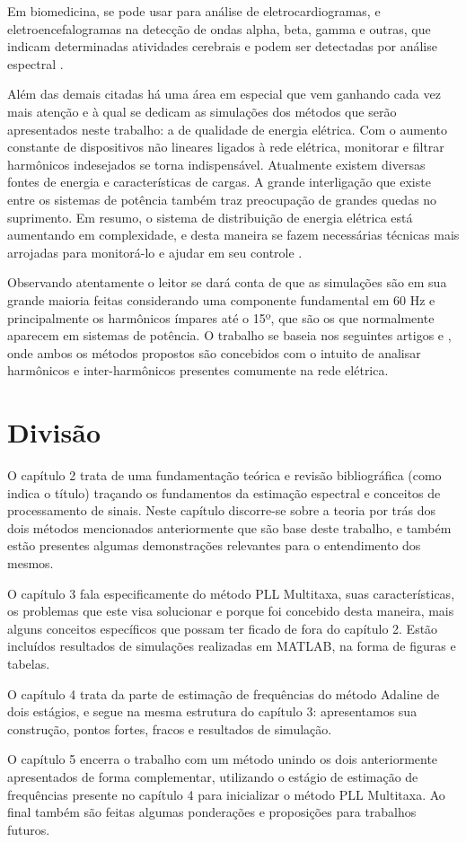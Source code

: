Em biomedicina, se pode usar para análise de eletrocardiogramas, e eletroencefalogramas na detecção de ondas alpha, beta, gamma e outras, que indicam determinadas atividades cerebrais e podem ser detectadas por análise espectral \cite{sornmo2005bioelectrical}.  

Além das demais citadas há uma área em especial que vem ganhando cada vez mais atenção e à qual se dedicam as simulações dos métodos que serão apresentados neste trabalho: a de qualidade de energia elétrica. Com o aumento constante de dispositivos não lineares ligados à rede elétrica, monitorar e filtrar harmônicos indesejados se torna indispensável. Atualmente existem diversas fontes de energia e características de cargas. A grande interligação que existe entre os sistemas de potência também traz preocupação de grandes quedas no suprimento. Em resumo, o sistema de distribuição de energia elétrica está aumentando em complexidade, e desta maneira se fazem necessárias técnicas mais arrojadas para monitorá-lo e ajudar em seu controle \cite{dugan1996electrical}.

Observando atentamente o leitor se dará conta de que as simulações são em sua grande maioria feitas considerando uma componente fundamental em 60 Hz e principalmente os harmônicos ímpares até o 15º, que são os que normalmente aparecem em sistemas de potência. O trabalho se baseia nos seguintes artigos \cite{de2009pll} e \cite{chang2009two}, onde ambos os métodos propostos são concebidos com o intuito de analisar harmônicos e inter-harmônicos presentes comumente na rede elétrica.

\section{Divisão}

O capítulo 2 trata de uma fundamentação teórica e revisão bibliográfica (como indica o título) traçando os fundamentos da estimação espectral e conceitos de processamento de sinais. Neste capítulo discorre-se sobre a teoria por trás dos dois métodos mencionados anteriormente que são base deste trabalho, e também estão presentes algumas demonstrações relevantes para o entendimento dos mesmos. 

O capítulo 3 fala especificamente do método PLL Multitaxa, suas características, os problemas que este visa solucionar e porque foi concebido desta maneira, mais alguns conceitos específicos que possam ter ficado de fora do capítulo 2. Estão incluídos resultados de simulações realizadas em MATLAB, na forma de figuras e tabelas.

O capítulo 4 trata da parte de estimação de frequências do método Adaline de dois estágios, e segue na mesma estrutura do capítulo 3: apresentamos sua construção, pontos fortes, fracos e resultados de simulação.

O capítulo 5 encerra o trabalho com um método unindo os dois anteriormente apresentados de forma complementar, utilizando o estágio de estimação de frequências presente no capítulo 4 para inicializar o método PLL Multitaxa. Ao final também são feitas algumas ponderações e proposições para trabalhos futuros.
